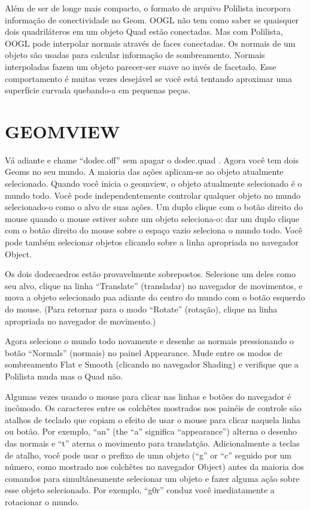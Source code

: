\documentclass[12pt,a4paper]{book}
\begin{document}
Além de ser de longe mais compacto, o formato de arquivo Polilista incorpora
informação de conectividade no Geom.  OOGL não tem como saber
se quaisquer dois quadriláteros em um objeto Quad estão conectadas.  Mas
com Polilista, OOGL pode interpolar normais através de faces conectadas.
Os normais de um objeto são usadas para calcular informação de sombreamento.
Normais interpoladas fazem um objeto parecer-ser suave ao invés de facetado.
Esse comportamento é muitas vezes desejável se você está tentando aproximar uma superfície
curvada quebando-a em pequenas peças.

\section{GEOMVIEW}

Vá adiante e chame ``dodec.off'' sem apagar o dodec.quad .  Agora
você tem dois Geoms no seu mundo.  A maioria das ações aplicam-se ao
objeto atualmente selecionado. Quando você inicia o geomview, o objeto
atualmente selecionado é o mundo todo. Você pode independentemente controlar qualquer
objeto no mundo selecionado-o como o alvo de suas ações.
Um duplo clique com o botão direito do mouse quando o mouse estiver sobre um
objeto seleciona-o: dar um duplo clique com o botão direito do mouse sobre o espaço vazio
seleciona o mundo todo. Você pode também selecionar objetos clicando sobre a
linha apropriada no navegador Object.

Os dois dodecaedros estão provavelmente sobrepostos.  Selecione um deles como
seu alvo, clique na linha ``Translate'' (transladar) no navegador de movimentos, e
mova a objeto selecionado paa adiante do centro do mundo com o botão esquerdo
do mouse.  (Para retornar para o modo ``Rotate'' (rotação), clique na linha apropriada no
navegador de movimento.)
 
Agora selecione o mundo todo novamente e desenhe as normais pressionando o
botão ``Normals'' (normais) no painel Appearance. Mude entre os modos de sombreamento
Flat e Smooth (clicando no navegador Shading) e verifique
que a Polilista muda mas o Quad não.  

Algumas vezes usando o mouse para clicar nas linhas e botões do navegador é
incômodo. Os caracteres entre os colchêtes mostrados nos painéis de controle são
atalhos de teclado que copiam o efeito de usar o mouse para
clicar naquela linha ou botão. Por exemplo, ``an'' (the ``a'' significa
``appearance'') alterna o desenho das normais e ``t'' aterna o movimento para
translatção.  Adicionalmente a teclas de atalho, você pode usar o prefixo de umn
objeto (``g'' or ``c'' seguido por um número, como mostrado nos colchêtes no
navegador Object) antes da maioria dos comandos para simultâneamente selecionar um objeto
e fazer alguma ação sobre esse objeto selecionado. Por exemplo, ``g0r'' conduz você imediatamente
a rotacionar o mundo.
\end{document}
